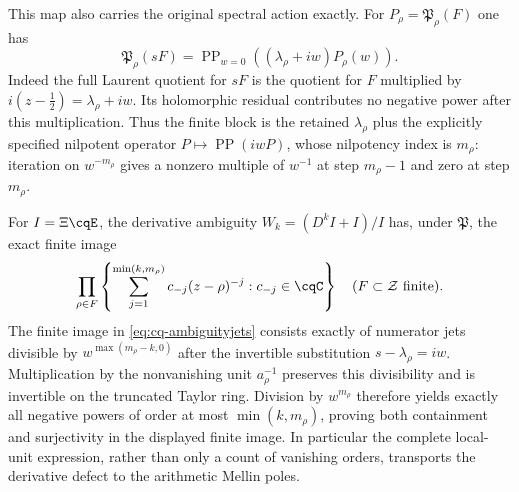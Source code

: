 This map also carries the original spectral action exactly. For
$P_\rho=\mathfrak P_\rho(F)$ one has
\begin{equation}\label{eq:cq-s-principalparts}
 \mathfrak P_\rho(sF)
 =\operatorname{PP}_{w=0}
                  ((\lambda_\rho+iw)P_\rho(w)).
\end{equation}
Indeed the full Laurent quotient for $sF$ is the quotient for $F$
multiplied by $i(z-\tfrac12)=\lambda_\rho+iw$.
Its holomorphic residual contributes no negative power after this
multiplication. Thus the finite block is the retained
$\lambda_\rho$ plus the explicitly specified nilpotent operator
$P\mapsto\operatorname{PP}(iwP)$, whose nilpotency index is
$m_\rho$: iteration on $w^{-m_\rho}$ gives a nonzero multiple
of $w^{-1}$ at step $m_\rho-1$ and zero at step $m_\rho$.

For $I=\Xi\cqE$, the derivative ambiguity
$W_k=(D^kI+I)/I$ has, under $\mathfrak P$, the exact finite image
\begin{equation}\label{eq:cq-principal-ambiguity}
 \prod_{\rho\in F}
 \left\{\sum_{j=1}^{\min(k,m_\rho)}c_{-j}(z-\rho)^{-j}:c_{-j}\in\cqC\right\}
 \quad(F\subset\mathcal Z\text{ finite}).
\end{equation}
The finite image in \eqref{eq:cq-ambiguityjets} consists exactly
of numerator jets divisible by $w^{\max(m_\rho-k,0)}$ after
the invertible substitution $s-\lambda_\rho=iw$.
Multiplication by the nonvanishing unit $a_\rho^{-1}$ preserves
this divisibility and is invertible on the truncated Taylor ring.
Division by $w^{m_\rho}$ therefore yields exactly all negative
powers of order at most $\min(k,m_\rho)$, proving both
containment and surjectivity in the displayed finite image.
In particular the complete local-unit expression, rather than only
a count of vanishing orders, transports the derivative defect to
the arithmetic Mellin poles.
